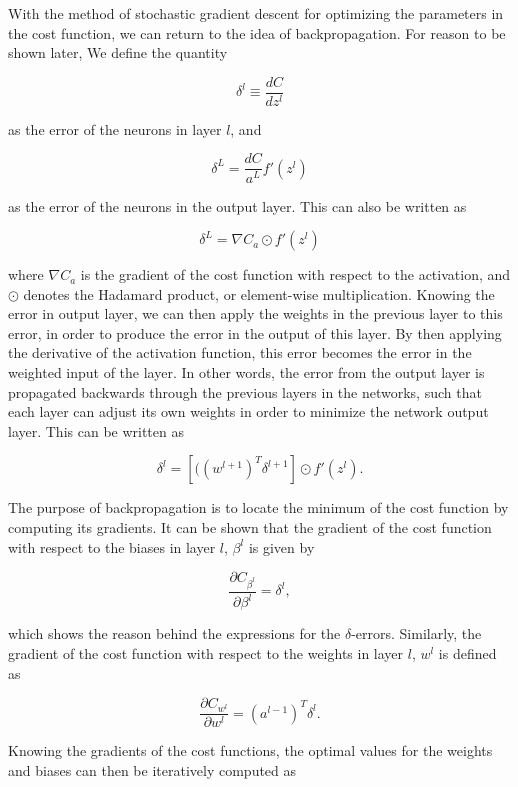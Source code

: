 \documentclass[a4paper,10pt,english]{article}
\begin{document}
With the method of stochastic gradient descent for optimizing the parameters in the cost function, we can return to the idea of backpropagation. For reason to be shown later, We define the quantity

$$\delta^l \equiv \frac{dC}{dz^l}$$

as the error of the neurons in layer $l$, and

$$\delta^L = \frac{dC}{a^L} f'(z^l)$$

as the error of the neurons in the output layer. This can also be written as

$$\delta^L = \nabla C_a \odot f'(z^l)$$

where $\nabla C_a$ is the gradient of the cost function with respect to the activation, and $\odot$ denotes the Hadamard product, or element-wise multiplication. Knowing the error in output layer, we can then apply the weights in the previous layer to this error, in order to produce the error in the output of this layer. By then applying the derivative of the activation function, this error becomes the error in the weighted input of the layer. In other words, the error from the output layer is propagated backwards through the previous layers in the networks, such that each layer can adjust its own weights in order to minimize the network output layer. This can be written as

$$\delta^l = \left[((w^{l+1})^T \delta^{l+1}\right] \odot f'(z^l).$$

The purpose of backpropagation is to locate the minimum of the cost function by computing its gradients. It can be shown that the gradient of the cost function with respect to the biases in layer $l$, $\beta^l$ is given by

\begin{equation}\label{eq:nablac_beta}
    \frac{\partial C_{\beta^l}}{\partial \beta^l} = \delta^l,
\end{equation}

which shows the reason behind the expressions for the $\delta$-errors. Similarly, the gradient of the cost function with respect to the weights in layer $l$, $w^l$ is defined as

\begin{equation}\label{eq:nablac_w}
    \frac{\partial C_{w^l}}{\partial w^l} = (a^{l-1})^T \delta^l.    
\end{equation}

Knowing the gradients of the cost functions, the optimal values for the weights and biases can then be iteratively computed as
\end{document}
